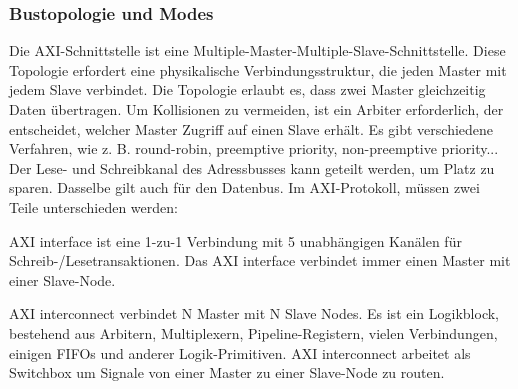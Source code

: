 \subsubsection{Bustopologie und Modes}
Die AXI-Schnittstelle ist eine Multiple-Master-Multiple-Slave-Schnittstelle. Diese Topologie erfordert eine physikalische Verbindungsstruktur, die jeden Master mit jedem Slave verbindet. Die Topologie erlaubt es, dass zwei Master gleichzeitig Daten übertragen. Um Kollisionen zu vermeiden, ist ein Arbiter erforderlich, der entscheidet, welcher Master Zugriff auf einen Slave erhält. Es gibt verschiedene Verfahren, wie z. B. round-robin, preemptive priority, non-preemptive priority...
Der Lese- und Schreibkanal des Adressbusses kann geteilt werden, um Platz zu sparen. Dasselbe gilt auch für den Datenbus. Im AXI-Protokoll, müssen zwei Teile unterschieden werden:
\begin{compactitem}
  \item AXI interface ist eine 1-zu-1 Verbindung mit 5 unabhängigen Kanälen für Schreib-/Lesetransaktionen. Das AXI interface verbindet immer einen Master mit einer Slave-Node.
  \item AXI interconnect verbindet N Master mit N Slave Nodes. Es ist ein Logikblock, bestehend aus Arbitern, Multiplexern, Pipeline-Registern, vielen Verbindungen, einigen FIFOs und anderer Logik-Primitiven. AXI interconnect arbeitet als Switchbox um Signale von einer Master zu einer Slave-Node zu routen.
\end{compactitem}


